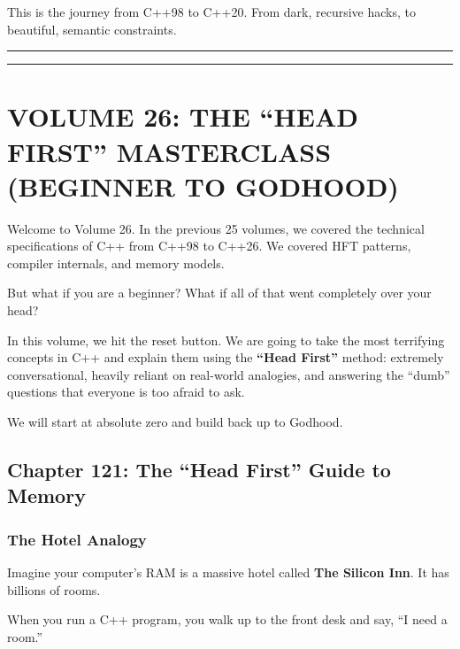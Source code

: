 This is the journey from C++98 to C++20. From dark, recursive hacks, to
beautiful, semantic constraints.

\begin{center}\rule{0.5\linewidth}{0.5pt}\end{center}

\begin{center}\rule{0.5\linewidth}{0.5pt}\end{center}

\hypertarget{volume-26-the-head-first-masterclass-beginner-to-godhood}{%
\section{VOLUME 26: THE ``HEAD FIRST'' MASTERCLASS (BEGINNER TO
GODHOOD)}\label{volume-26-the-head-first-masterclass-beginner-to-godhood}}

Welcome to Volume 26. In the previous 25 volumes, we covered the
technical specifications of C++ from C++98 to C++26. We covered HFT
patterns, compiler internals, and memory models.

But what if you are a beginner? What if all of that went completely over
your head?

In this volume, we hit the reset button. We are going to take the most
terrifying concepts in C++ and explain them using the \textbf{``Head
First''} method: extremely conversational, heavily reliant on real-world
analogies, and answering the ``dumb'' questions that everyone is too
afraid to ask.

We will start at absolute zero and build back up to Godhood.

\hypertarget{chapter-121-the-head-first-guide-to-memory}{%
\subsection{Chapter 121: The ``Head First'' Guide to
Memory}\label{chapter-121-the-head-first-guide-to-memory}}

\hypertarget{the-hotel-analogy}{%
\subsubsection{The Hotel Analogy}\label{the-hotel-analogy}}

Imagine your computer's RAM is a massive hotel called \textbf{The
Silicon Inn}. It has billions of rooms.

When you run a C++ program, you walk up to the front desk and say, ``I
need a room.''

